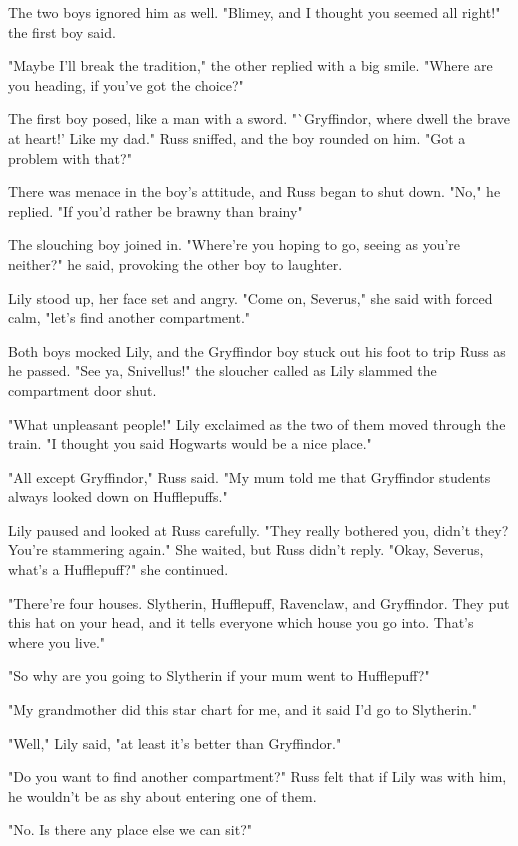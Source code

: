 The two boys ignored him as well. "Blimey, and I thought you seemed all right!" the first boy said.

"Maybe I'll break the tradition," the other replied with a big smile. "Where are you heading, if you've got the choice?"

The first boy posed, like a man with a sword. "`Gryffindor, where dwell the brave at heart!' Like my dad." Russ sniffed, and the boy rounded on him. "Got a problem with that?"

There was menace in the boy's attitude, and Russ began to shut down. "No," he replied. "If you'd rather be brawny than brainy{\el}"

The slouching boy joined in. "Where're you hoping to go, seeing as you're neither?" he said, provoking the other boy to laughter.

Lily stood up, her face set and angry. "Come on, Severus," she said with forced calm, "let's find another compartment."

Both boys mocked Lily, and the Gryffindor boy stuck out his foot to trip Russ as he passed. "See ya, Snivellus!" the sloucher called as Lily slammed the compartment door shut.

"What unpleasant people!" Lily exclaimed as the two of them moved through the train. "I thought you said Hogwarts would be a nice place."

"All except{\el} Gryffindor," Russ said. "My mum told me that{\el} Gryffindor students always looked{\el} down on Hufflepuffs."

Lily paused and looked at Russ carefully. "They really bothered you, didn't they? You're stammering again." She waited, but Russ didn't reply. "Okay, Severus, what's a Hufflepuff?" she continued.

"There're four{\el} houses. Slytherin, Hufflepuff, Ravenclaw, and{\el} Gryffindor. They put this hat on your{\el} head, and it tells everyone which{\el} house you go into. That's where you live."

"So why are you going to Slytherin if your mum went to Hufflepuff?"

"My grandmother did this star chart for me, and it{\el} said I'd go to Slytherin."

"Well," Lily said, "at least it's better than Gryffindor."

"Do you want to find another compartment?" Russ felt that if Lily was with him, he wouldn't be as shy about entering one of them.

"No. Is there any place else we can sit?"

